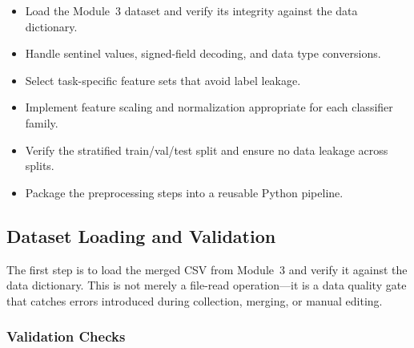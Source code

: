 \documentclass[11pt,letterpaper]{article}
\begin{document}
	\begin{itemize}[leftmargin=2em]
		\item Load the Module~3 dataset and verify its integrity against the data dictionary.
		\item Handle sentinel values, signed-field decoding, and data type conversions.
		\item Select task-specific feature sets that avoid label leakage.
		\item Implement feature scaling and normalization appropriate for each classifier family.
		\item Verify the stratified train/val/test split and ensure no data leakage across splits.
		\item Package the preprocessing steps into a reusable Python pipeline.
	\end{itemize}

	\subsection{Dataset Loading and Validation}

	The first step is to load the merged CSV from Module~3 and verify it against the data dictionary. This is not merely a file-read operation---it is a data quality gate that catches errors introduced during collection, merging, or manual editing.

	\subsubsection{Validation Checks}
\end{document}
